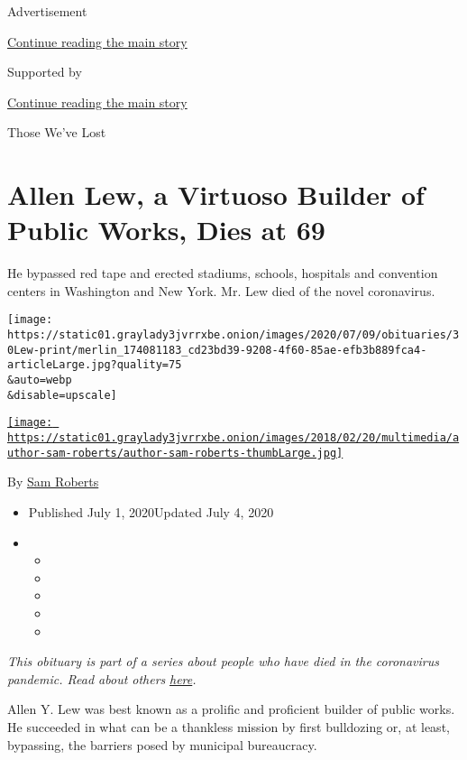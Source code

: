 Advertisement

\protect\hyperlink{after-top}{Continue reading the main story}

Supported by

\protect\hyperlink{after-sponsor}{Continue reading the main story}

Those We've Lost

\hypertarget{allen-lew-a-virtuoso-builder-of-public-works-dies-at-69}{%
\section{Allen Lew, a Virtuoso Builder of Public Works, Dies at
69}\label{allen-lew-a-virtuoso-builder-of-public-works-dies-at-69}}

He bypassed red tape and erected stadiums, schools, hospitals and
convention centers in Washington and New York. Mr. Lew died of the novel
coronavirus.

\texttt{[image: https://static01.graylady3jvrrxbe.onion/images/2020/07/09/obituaries/30Lew-print/merlin\_174081183\_cd23bd39-9208-4f60-85ae-efb3b889fca4-articleLarge.jpg?quality=75\\\&auto=webp\\\&disable=upscale]}

\href{https://www.nytimes3xbfgragh.onion/by/sam-roberts}{\texttt{[image: https://static01.graylady3jvrrxbe.onion/images/2018/02/20/multimedia/author-sam-roberts/author-sam-roberts-thumbLarge.jpg]}}

By \href{https://www.nytimes3xbfgragh.onion/by/sam-roberts}{Sam Roberts}

\begin{itemize}
\item
  Published July 1, 2020Updated July 4, 2020
\item
  \begin{itemize}
  \item
  \item
  \item
  \item
  \item
  \end{itemize}
\end{itemize}

\emph{This obituary is part of a series about people who have died in
the coronavirus pandemic. Read about others}
\href{https://www.nytimes3xbfgragh.onion/interactive/2020/obituaries/people-died-coronavirus-obituaries.html}{\emph{here}}\emph{.}

Allen Y. Lew was best known as a prolific and proficient builder of
public works. He succeeded in what can be a thankless mission by first
bulldozing or, at least, bypassing, the barriers posed by municipal
bureaucracy.

